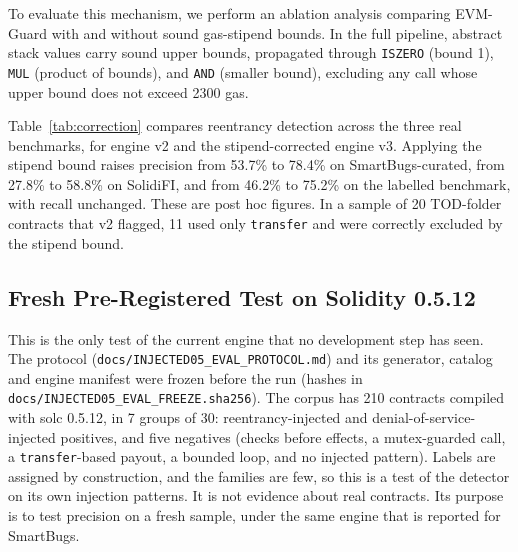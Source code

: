 \documentclass[pdflatex,sn-mathphys]{sn-jnl}
\theoremstyle{thmstyleone}
\theoremstyle{thmstyletwo}
\begin{document}
To evaluate this mechanism, we perform an ablation analysis comparing EVM-Guard with and without sound gas-stipend bounds. In the full pipeline, abstract stack values carry sound upper bounds, propagated through \texttt{ISZERO} (bound 1), \texttt{MUL} (product of bounds), and \texttt{AND} (smaller bound), excluding any call whose upper bound does not exceed 2300 gas.

Table~\ref{tab:correction} compares reentrancy detection across the three real benchmarks, for engine v2 and the stipend-corrected engine v3. Applying the stipend bound raises precision from 53.7\% to 78.4\% on SmartBugs-curated, from 27.8\% to 58.8\% on SolidiFI, and from 46.2\% to 75.2\% on the labelled benchmark, with recall unchanged. These are post hoc figures. In a sample of 20 TOD-folder contracts that v2 flagged, 11 used only \texttt{transfer} and were correctly excluded by the stipend bound.

\begin{table}[t]
\centering
\small
\caption{Ablation study on reentrancy (SWC-107) detection: impact of sound 2300-gas stipend bounds across all three benchmark suites. Bounding the gas stipend reduces false positives while preserving 100\% of true positives.}
\label{tab:correction}
\end{table}

\subsection{Fresh Pre-Registered Test on Solidity 0.5.12}\label{sec:results:fresh}
This is the only test of the current engine that no development step has seen. The protocol (\texttt{docs/INJECTED05\_EVAL\_PROTOCOL.md}) and its generator, catalog and engine manifest were frozen before the run (hashes in \texttt{docs/INJECTED05\_EVAL\_FREEZE.sha256}). The corpus has 210 contracts compiled with solc 0.5.12, in 7 groups of 30: reentrancy-injected and denial-of-service-injected positives, and five negatives (checks before effects, a mutex-guarded call, a \texttt{transfer}-based payout, a bounded loop, and no injected pattern). Labels are assigned by construction, and the families are few, so this is a test of the detector on its own injection patterns. It is not evidence about real contracts. Its purpose is to test precision on a fresh sample, under the same engine that is reported for SmartBugs.
\end{document}
